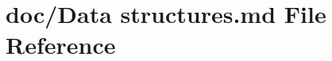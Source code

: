 \hypertarget{_data_01structures_8md}{\section{doc/\-Data structures.\-md File Reference}
\label{_data_01structures_8md}
}

